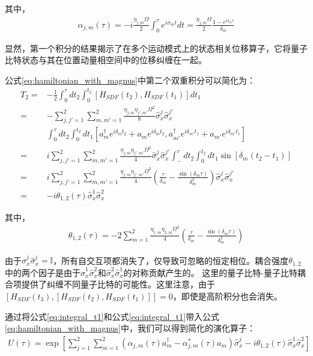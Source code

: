 其中，
\begin{align}
    \alpha_{j,m}(\tau)=-i\frac{\eta_{j,m}\Omega}{2}\int_{0}^{\tau}e^{i\sigma_m t}dt=\frac{\eta_{j,m}\Omega}{2}\frac{1-e^{i\delta_m\tau}}{\delta_m}\label{eq:alpha_j_m}
\end{align}

显然，第一个积分的结果揭示了在多个运动模式上的状态相关位移算子，它将量子比特状态与其在位置动量相空间中的位移纠缠在一起。

公式\eqref{eq:hamiltonian_with_magnus}中第二个双重积分可以简化为：
\begin{align}
    T_2=&-\frac{1}{2}\int_{0}^{\tau}dt_2\int_{0}^{t_2}[H_{SDF}(t_2),H_{SDF}(t_1)]dt_1\\
    =&-\sum_{j,j'=1}^{2}\sum_{m,m'=1}^{2}\frac{\eta_{j,m}\eta_{j',m'}\Omega^2}{8}\hat{\sigma}_x^j\hat{\sigma}_x^{j'}\\
    &\int_{0}^{\tau}dt_2\int_{0}^{t_2}dt_1\left[a_m^\dagger e^{i\delta_m t_2}+a_m e^{i\delta_m t_2}, a_{m'}^\dagger e^{i\delta_{m'} t_1}+a_{m'} e^{i\delta_{m'} t_1}\right]\\
    =&i\sum_{j,j'=1}^{2}\sum_{m,m'=1}^{2}\frac{\eta_{j,m}\eta_{j',m'}\Omega^2}{4}\hat{\sigma}_x^j\hat{\sigma}_x^{j'}\int_{-}^{\tau}dt_2\int_{0}^{t_2}dt_1\sin[\delta_m(t_2-t_1)]\\
    =&i\sum_{j,j'=1}^{2}\sum_{m,m'=1}^{2}\frac{\eta_{j,m}\eta_{j',m'}\Omega^2}{4}\left(\frac{\tau}{\delta_m}-\frac{\sin(\delta_m\tau)}{\delta_m^2}\right)\hat{\sigma}_x^j\hat{\sigma}_x^{j'}\\
    =&-i\theta_{1,2}(\tau)\hat{\sigma}_x^1\hat{\sigma}_x^2\label{eq:integral_t2}
\end{align}

其中，
\begin{align}
    \theta_{1,2}(\tau)=-2\sum_{m=1}^{2}\frac{\eta_{1,m}\eta_{2,m}\Omega^2}{4}\left(\frac{\tau}{\delta_m}-\frac{\sin(\delta_m\tau)}{\delta_m^2}\right)
\end{align}

由于$\hat{\sigma}_x^j\hat{\sigma}_x^j=\mathbb{I}$，所有自交互项都消失了，仅导致可忽略的恒定相位。耦合强度$\theta_{1,2}$中的两个因子是由于$\hat{\sigma}_x^1\hat{\sigma}_x^2$和$\hat{\sigma}_x^2\hat{\sigma}_x^1$的对称贡献产生的。
这里的量子比特-量子比特耦合项提供了纠缠不同量子比特的可能性。这里注意，由于$[H_{SDF}(t_3),[H_{SDF}(t_2),H_{SDF}(t_1)]]=0$，即使是高阶积分也会消失。

通过将公式\eqref{eq:integral_t1}和公式\eqref{eq:integral_t1}带入公式\eqref{eq:hamiltonian_with_magnus}中，我们可以得到简化的演化算子：
\begin{align}
    U(\tau)=\exp\left[\sum_{j=1}^{2}\sum_{m=1}^{2}\left(\alpha_{j,m}(\tau)a_m^\dagger-\alpha_{j,m}^*(\tau)a_m\right)\hat{\sigma}_x^j-i\theta_{1,2}(\tau)\hat{\sigma}_x^1\hat{\sigma}_x^2\right]
\end{align}


